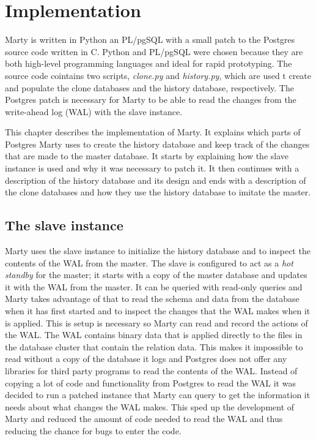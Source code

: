 \chapter{Implementation}
Marty is written in Python an PL/pgSQL with a small patch to the Postgres source code written in C.
Python and PL/pgSQL were chosen because they are both high-level programming languages and ideal for rapid prototyping.
The source code cointains two scripts, \textit{clone.py} and \textit{history.py}, which are used t create and populate the clone databases and the history database, respectively.
The Postgres patch is necessary for Marty to be able to read the changes from the write-ahead log (WAL) with the slave instance.

This chapter describes the implementation of Marty.
It explains which parts of Postgres Marty uses to create the history database and keep track of the changes that are made to the master database.
It starts by explaining how the slave instance is used and why it was necessary to patch it.
It then continues with a description of the history database and its design and ends with a description of the clone databases and how they use the history database to imitate the master.

\section{The slave instance}
Marty uses the slave instance to initialize the history database and to inspect the contents of the WAL from the master.
The slave is configured to act as a \textit{hot standby} for the master; it starts with a copy of the master database and updates it with the WAL from the master.
It can be queried with read-only queries and Marty takes advantage of that to read the schema and data from the database when it has first started and to inspect the changes that the WAL makes when it is applied.
This is setup is necessary so Marty can read and record the actions of the WAL.
The WAL contains binary data that is applied directly to the files in the database cluster that contain the relation data.
This makes it impossible to read without a copy of the database it logs and Postgres does not offer any libraries for third party programs to read the contents of the WAL.
Instead of copying a lot of code and functionality from Postgres to read the WAL it was decided to run a patched instance that Marty can query to get the information it needs about what changes the WAL makes.
This sped up the development of Marty and reduced the amount of code needed to read the WAL and thus reducing the chance for bugs to enter the code.

